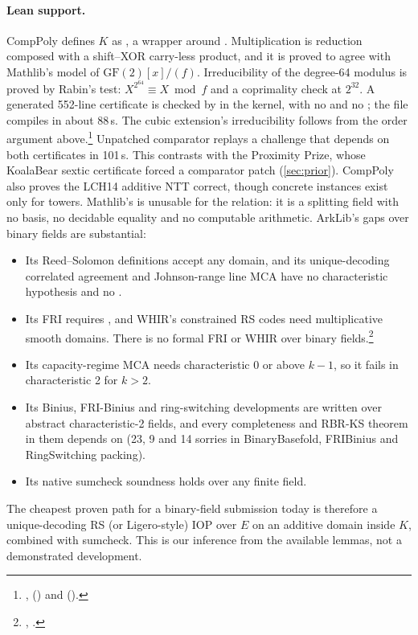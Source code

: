 \paragraph{Lean support.} CompPoly defines $K$ as , a wrapper around
. Multiplication is reduction composed with a shift--XOR carry-less product, and
it is proved to agree with Mathlib's  model of $\mathrm{GF}(2)[x]/(f)$.
Irreducibility of the degree-64 modulus is proved by Rabin's test: $X^{2^{64}}\equiv X \bmod f$
and a coprimality check at $2^{32}$. A generated 552-line certificate is checked by 
in the kernel, with no  and no ; the file compiles in about 88\,s.
The cubic extension's irreducibility follows from the order argument above.\footnote{,
 () and
 ().} Unpatched
comparator replays a challenge that depends on both certificates in 101\,s. This contrasts with the
Proximity Prize, whose KoalaBear sextic certificate forced a comparator patch (\cref{sec:prior}).
CompPoly also proves the LCH14 additive NTT correct, though concrete instances exist only for
towers. Mathlib's  is unusable for the relation: it is a splitting field
with no basis, no decidable equality and no computable arithmetic. ArkLib's gaps over binary fields
are substantial:
\begin{itemize}[nosep]
\item Its Reed--Solomon definitions accept any domain, and its unique-decoding correlated agreement
  and Johnson-range line MCA have no characteristic hypothesis and no .
\item Its FRI requires \lean{[NonBinaryField F]}, and WHIR's constrained RS codes need
  multiplicative smooth domains. There is no formal FRI or WHIR over binary
  fields.\footnote{, .}
\item Its capacity-regime MCA needs characteristic $0$ or above $k-1$, so it fails in characteristic
  2 for $k>2$.
\item Its Binius, FRI-Binius and ring-switching developments are written over abstract
  characteristic-2 fields, and every completeness and RBR-KS theorem in them depends on
   (23, 9 and 14 sorries in BinaryBasefold, FRIBinius and RingSwitching packing).
\item Its native sumcheck soundness holds over any finite field.
\end{itemize}
The cheapest proven path for a binary-field submission today is therefore a unique-decoding RS (or
Ligero-style) IOP over $E$ on an additive domain inside $K$, combined with sumcheck. This is our
inference from the available lemmas, not a demonstrated development.

